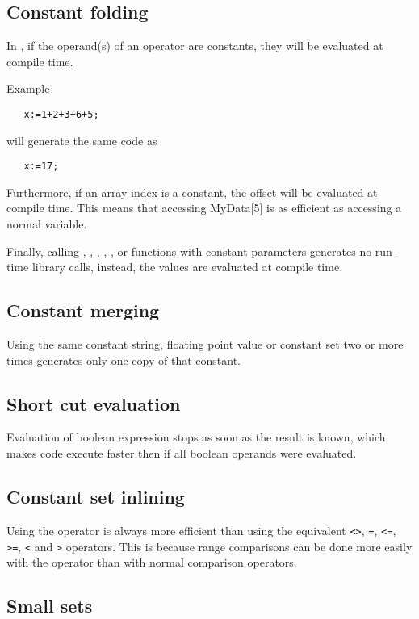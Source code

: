 \subsection{Constant folding}

In \fpc, if the operand(s) of an operator are constants, they
will be evaluated at compile time.

Example

\begin{verbatim}
   x:=1+2+3+6+5;
\end{verbatim}
will generate the same code as
\begin{verbatim}
   x:=17;
\end{verbatim}

Furthermore, if an array index is a constant, the offset will
be evaluated at compile time. This means that accessing MyData[5]
is as efficient as accessing a normal variable.

Finally, calling , , , , ,
or  functions with constant parameters generates no
run-time library calls, instead, the values are evaluated at
compile time.

\subsection{Constant merging}

Using the same constant string, floating point value or constant set 
two or more times generates only one copy of that constant.

\subsection{Short cut evaluation}

Evaluation of boolean expression stops as soon as the result is
known, which makes code execute faster then if all boolean operands
were evaluated.

\subsection{Constant set inlining}

Using the  operator is always more efficient than using the
equivalent \verb|<>|, \verb|=|, \verb|<=|, \verb|>=|, \verb|<| and \verb|>|
operators. This is because range comparisons can be done more easily with
the  operator than with normal comparison operators.

\subsection{Small sets}

